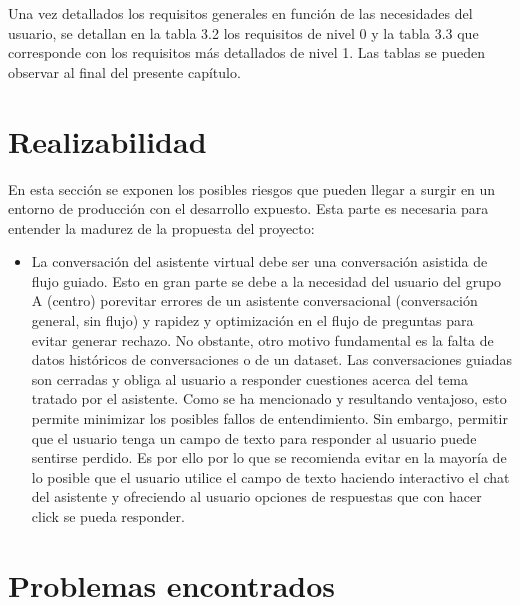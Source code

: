 Una vez detallados los requisitos generales en función de las necesidades del usuario, se detallan en la tabla 3.2 los requisitos de nivel 0 y la tabla 3.3 que corresponde con los requisitos más detallados de nivel 1. Las tablas se pueden observar al final del presente capítulo.







\section{Realizabilidad}

En esta sección se exponen los posibles riesgos que pueden llegar a surgir en un entorno de producción con el desarrollo expuesto. Esta parte es necesaria para entender la madurez de la propuesta del proyecto:

\begin{itemize}
    \item La conversación del asistente virtual debe ser una conversación asistida de flujo guiado. Esto en gran parte se debe a la necesidad del usuario del grupo A (centro) porevitar errores de un asistente conversacional (conversación general, sin flujo) y rapidez y optimización en el flujo de preguntas para evitar generar rechazo. No obstante, otro motivo fundamental es la falta de datos históricos de conversaciones o de un dataset. Las conversaciones guiadas son cerradas y obliga al usuario a responder cuestiones acerca del tema tratado por el asistente. Como se ha mencionado y resultando ventajoso, esto permite minimizar los posibles fallos de entendimiento. Sin embargo, permitir que el usuario tenga un campo de texto para responder al usuario puede sentirse perdido. Es por ello por lo que se recomienda evitar en la mayoría de lo posible que el usuario utilice el campo de texto haciendo interactivo el chat del asistente y ofreciendo al usuario opciones de respuestas que con hacer click se pueda responder.

\end{itemize}




\section{Problemas encontrados}

